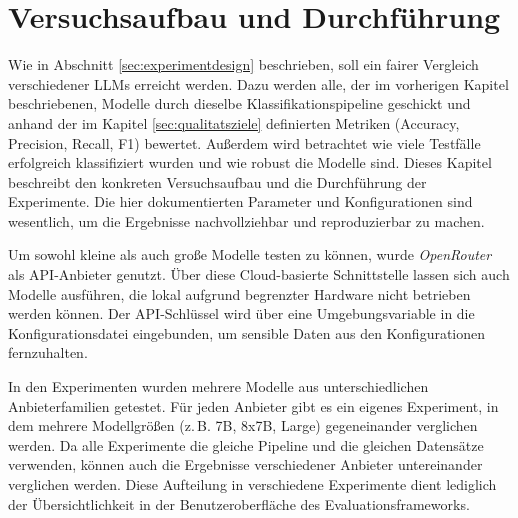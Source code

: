 \chapter{Versuchsaufbau und Durchführung}\label{ch:versuchsaufbau-und-durchfuhrung}

Wie in Abschnitt \ref{sec:experimentdesign} beschrieben, soll ein fairer Vergleich verschiedener \acp{LLM} erreicht werden. Dazu werden alle, der im vorherigen Kapitel beschriebenen, Modelle durch dieselbe Klassifikationspipeline geschickt und anhand der im Kapitel \ref{sec:qualitatsziele} definierten Metriken (Accuracy, Precision, Recall, F1) bewertet. Außerdem wird betrachtet wie viele Testfälle erfolgreich klassifiziert wurden und wie robust die Modelle sind. Dieses Kapitel beschreibt den konkreten Versuchsaufbau und die Durchführung der Experimente. Die hier dokumentierten Parameter und Konfigurationen sind wesentlich, um die Ergebnisse nachvollziehbar und reproduzierbar zu machen.

Um sowohl kleine als auch große Modelle testen zu können, wurde \emph{OpenRouter} \cite{openrouter} als API-Anbieter genutzt. Über diese Cloud-basierte Schnittstelle lassen sich auch Modelle ausführen, die lokal aufgrund begrenzter Hardware nicht betrieben werden können. Der API-Schlüssel wird über eine Umgebungsvariable in die Konfigurationsdatei eingebunden, um sensible Daten aus den Konfigurationen fernzuhalten.

In den Experimenten wurden mehrere Modelle aus unterschiedlichen Anbieterfamilien getestet. Für jeden Anbieter gibt es ein eigenes Experiment, in dem mehrere Modellgrößen (z.\,B. 7B, 8x7B, Large) gegeneinander verglichen werden. Da alle Experimente die gleiche Pipeline und die gleichen Datensätze verwenden, können auch die Ergebnisse verschiedener Anbieter untereinander verglichen werden. Diese Aufteilung in verschiedene Experimente dient lediglich der Übersichtlichkeit in der Benutzeroberfläche des Evaluationsframeworks.




